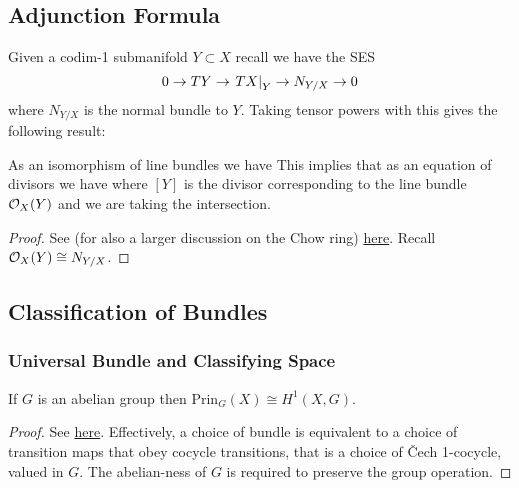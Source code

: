 \documentclass{article}
\begin{document}
\subsection{Adjunction Formula}
Given a codim-1 submanifold $Y \subset X$ recall we have the SES 
\[
0 \to TY \to \left. TX \right\rvert_{Y} \to N_{Y/X} \to 0
\]
where $N_{Y/X}$ is the normal bundle to $Y$. Taking tensor powers with this gives the following result:
\begin{theorem}
	As an isomorphism of line bundles we have 
This implies that as an equation of divisors we have
where $[Y]$ is the divisor corresponding to the line bundle $\mathcal{O}_X(Y)$ and we are taking the intersection.  
\end{theorem}
\begin{proof}
	See (for also a larger discussion on the Chow ring) \href{https://scholar.harvard.edu/files/joeharris/files/000-final-3264.pdf}{here}. Recall $\mathcal{O}_X(Y) \cong N_{Y/X}$.   
\end{proof}


\subsection{Classification of Bundles}
\subsubsection{Universal Bundle and Classifying Space}

\begin{prop}\label{prop: principal bundles cong H^1}
	If $G$ is an abelian group then $\text{Prin}_G(X) \cong H^1(X,G)$. 
\end{prop}
\begin{proof}
	See \href{https://math.colorado.edu/~rohi1040/expository/param_spin.pdf}{here}. Effectively, a choice of bundle is equivalent to a choice of transition maps that obey cocycle transitions, that is a choice of \v{C}ech 1-cocycle, valued in $G$. The abelian-ness of $G$ is required to preserve the group operation.  
\end{proof}

\end{document}
